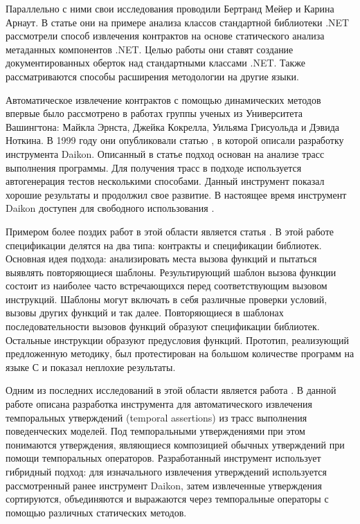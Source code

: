 Параллельно с ними свои исследования проводили Бертранд Мейер и Карина Арнаут. В статье \cite{uncoveringHiddenContracts} они на примере анализа классов стандартной библиотеки .NET рассмотрели способ извлечения контрактов на основе статического анализа метаданных компонентов .NET. Целью работы они ставят создание документированных оберток над стандартными классами .NET. Также рассматриваются способы расширения методологии на другие языки. 

Автоматическое извлечение контрактов с помощью динамических методов впервые было рассмотрено в работах группы ученых из Университета Вашингтона: Майкла Эрнста, Джейка Кокрелла, Уильяма Грисуольда и Дэвида Ноткина. В 1999 году они опубликовали статью \cite{discoveringInvariants}, в которой описали разработку инструмента Daikon. Описанный в статье подход основан на анализе трасс выполнения программы. Для получения трасс в подходе используется автогенерация тестов несколькими способами. Данный инструмент показал хорошие результаты и продолжил свое развитие. В настоящее время инструмент Daikon доступен для свободного использования \cite{daikon}.

Примером более поздих работ в этой области является статья \cite{staticPredicateMining}. В этой работе спецификации делятся на два типа: контракты и спецификации библиотек. Основная идея подхода: анализировать места вызова функций и пытаться выявлять повторяющиеся шаблоны. Результирующий шаблон вызова функции состоит из наиболее часто встречающихся перед соответствующим вызовом инструкций. Шаблоны могут включать в себя различные проверки условий, вызовы других функций и так далее. Повторяющиеся в шаблонах последовательности вызовов функций образуют спецификации библиотек. Остальные инструкции образуют предусловия функций. Прототип, реализующий предложенную методику, был протестирован на большом количестве программ на языке С и показал неплохие результаты.

Одним из последних исследований в этой области является работа \cite{automiticAssertionsExtraction}. В данной работе описана разработка инструмента для автоматического извлечения темпоральных утверждений (temporal assertions) из трасс выполнения поведенческих моделей. Под темпоральными утверждениями при этом понимаются утверждения, являющиеся композицией обычных утверждений при помощи темпоральных операторов. Разработанный инструмент использует гибридный подход: для изначального извлечения утверждений используется рассмотренный ранее инструмент Daikon, затем извлеченные утверждения сортируются, объединяются и выражаются через темпоральные операторы с помощью различных статических методов.

